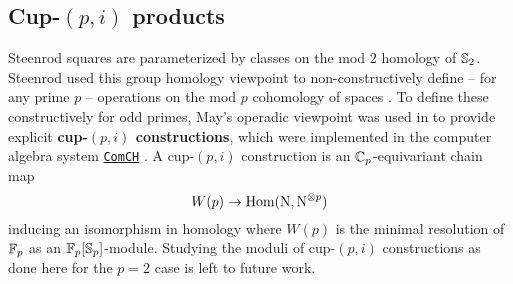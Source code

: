\subsection{Cup-$(p,i)$ products}

Steenrod squares are parameterized by classes on the mod $2$ homology of $\mathbb{S}_2$.
Steenrod used this group homology viewpoint to non-constructively define -- for any prime $p$ -- operations on the mod $p$ cohomology of spaces \cite{steenrod1952reduced, steenrod1953cyclic}.
To define these constructively for odd primes, May's operadic viewpoint \cite{may1970general} was used in \cite{medina2021may_st} to provide explicit \textbf{cup-$(p,i)$ constructions}, which were implemented in the computer algebra system \href{https://github.com/ammedmar/comch}{\texttt{ComCH}} \cite{medina2021comch}.
A cup-$(p,i)$ construction is an $\mathbb{C}_p$-equivariant chain map
\[
W(p) \to \mathrm{Hom}(\operatorname{N}, \operatorname{N}^{\otimes p})
\]
inducing an isomorphism in homology where $W(p)$
is the minimal resolution of ${\mathbb{F}_p}$ as an ${\mathbb{F}_p}[\mathbb{S}_p]$-module.
Studying the moduli of cup-$(p,i)$ constructions as done here for the $p = 2$ case is left to future work.
